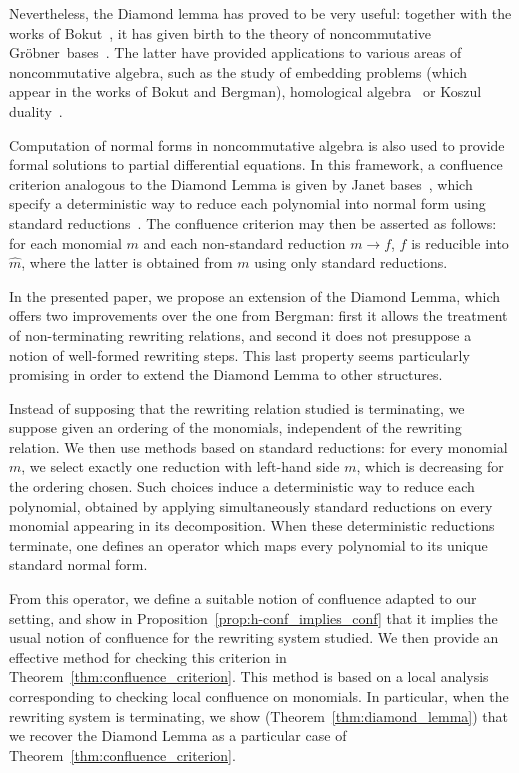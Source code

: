 \documentclass[10pt]{easychair}
\theoremstyle{definition}
\newcommand\G{Gröbner}
\begin{document}
Nevertheless, the Diamond lemma has proved to be very useful: together with the works of Bokut~\cite{MR0506423}, it has given birth to the theory of noncommutative \G\ bases~\cite{MR1299371}. The latter have provided applications to various areas of noncommutative algebra, such as the study of embedding problems (which appear in the works of Bokut and Bergman), homological algebra~\cite{MR1072284, MR2110434} or Koszul duality~\cite{MR1832913, MR0265437}.

Computation of normal forms in noncommutative algebra is also used to provide formal solutions to partial differential equations. In this framework, a confluence criterion analogous to the Diamond Lemma is given by Janet bases~\cite{MR2394773}, which specify a deterministic way to reduce each polynomial into normal form using standard reductions~\cite{Mell}. The confluence criterion may then be asserted as follows: for each monomial $m$ and each non-standard reduction $m\to f$, $f$ is reducible into $\widehat{m}$, where the latter is obtained from $m$ using only standard reductions.

In the presented paper, we propose an extension of the Diamond Lemma, which offers two improvements over the one from Bergman: first it allows the treatment of non-terminating rewriting relations, and second it does not presuppose a notion of well-formed rewriting steps. This last property seems particularly promising in order to extend the Diamond Lemma to other structures.

Instead of supposing that the rewriting relation studied is terminating, we suppose given an ordering of the monomials, independent of the rewriting relation.
We then use methods based on standard reductions: for every monomial $m$, we select exactly one reduction with left-hand side $m$, which is decreasing for the ordering chosen. Such choices induce a deterministic way to reduce each polynomial, obtained by applying simultaneously standard reductions on every monomial appearing in its decomposition. When these deterministic reductions terminate, one defines an operator which maps every polynomial to its unique standard normal form.

From this operator, we define a suitable notion of confluence adapted to  our setting, and show in Proposition~\ref{prop:h-conf_implies_conf} that it implies the usual notion of confluence for the rewriting system studied. We then provide an effective method for checking this criterion in  Theorem~\ref{thm:confluence_criterion}. This method is based on a local analysis corresponding to checking local confluence on monomials. In particular, when the rewriting system is terminating, we show (Theorem~\ref{thm:diamond_lemma}) that we recover the Diamond Lemma as a particular case of Theorem~\ref{thm:confluence_criterion}.
\end{document}
